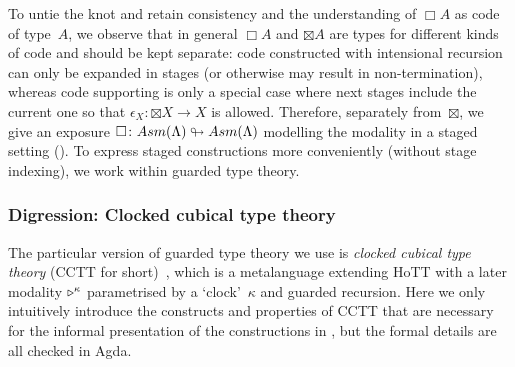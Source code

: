 \documentclass[a4paper,UKenglish,numberwithinsect,cleveref,thm-restate]{lipics-v2021}
\numberwithin{equation}{section}
\theoremstyle{definition}
\theoremstyle{plain}
\begin{document}
To untie the knot and retain consistency and the understanding of $\Box A$ as code of type~$A$, we observe that in general $\Box A$ and $\boxtimes A$ are types for different kinds of code and should be kept separate: code constructed with intensional recursion can only be expanded in stages (or otherwise may result in non-termination), whereas code supporting \SFour is only a special case where next stages include the current one so that $\epsilon_X\colon {\boxtimes} X \to X$ is allowed.
Therefore, separately from~$\boxtimes$, we give an exposure $\Box \colon \Asm(\Lambda) \looparrowright \Asm(\Lambda)$ modelling the \GL modality in a staged setting ().
To express staged constructions more conveniently (without stage indexing), we work within guarded type theory.

\subsubsection{Digression: Clocked cubical type theory}

The particular version of guarded type theory we use is \emph{clocked cubical type theory} (CCTT for short)~\cite{Kristensen2021}, which is a metalanguage extending HoTT with a later modality $\mathord{\triangleright}^\kappa$ parametrised by a `clock'~$\kappa$ and guarded recursion.
Here we only intuitively introduce the constructs and properties of CCTT that are necessary for the informal presentation of the constructions in , but the formal details are all checked in Agda.

\end{document}
